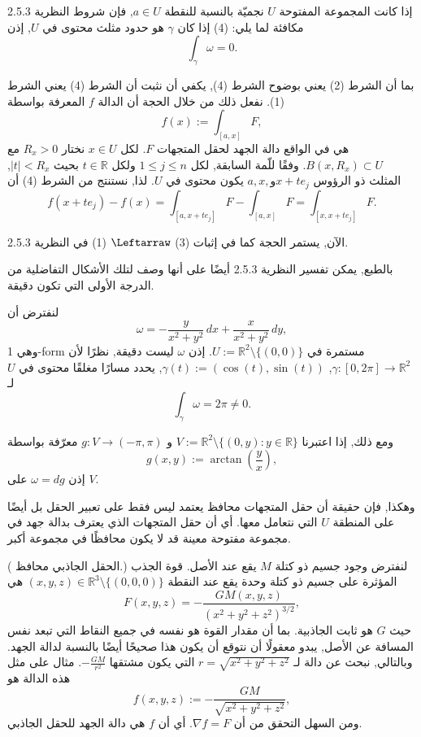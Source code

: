 \begin{theoreme}
إذا كانت المجموعة المفتوحة \( U \) نجميّة بالنسبة للنقطة \( a \in U \), فإن شروط النظرية 2.5.3 مكافئة لما يلي:
(4) إذا كان \( \gamma \) هو حدود مثلث محتوى في \( U \), إذن
\[ \int_\gamma \omega = 0. \]
\end{theoreme}

\begin{demonstration}
بما أن الشرط (2) يعني بوضوح الشرط (4), يكفي أن نثبت أن الشرط (4) يعني الشرط (1). نفعل ذلك من خلال الحجة أن الدالة \( f \) المعرفة بواسطة
\[ f(x) := \int_{[a, x]} F, \]
هي في الواقع دالة الجهد لحقل المتجهات \( F \). لكل \( x \in U \) نختار \( R_x > 0 \) مع \( B(x, R_x) \subset U \). وفقًا للّمة السابقة, لكل \( 1 \leq j \leq n \) ولكل \( t \in \mathbb{R} \) بحيث \(|t| < R_x \), المثلث ذو الرؤوس \( a, x, و x + t e_j \) يكون محتوى في \( U \). لذا, نستنتج من الشرط (4) أن
\[ f(x + t e_j) - f(x) = \int_{[a, x + t e_j]} F - \int_{[a, x]} F = \int_{[x, x + t e_j]} F. \]

الآن, يستمر الحجة كما في إثبات (3) $\Leftarraw$ (1) في النظرية 2.5.3. 
\end{demonstration}
بالطبع, يمكن تفسير النظرية 2.5.3 أيضًا على أنها وصف لتلك الأشكال التفاضلية من الدرجة الأولى التي تكون دقيقة.

\begin{exemple}
    لنفترض أن
\[ \omega = -\frac{y}{x^2 + y^2} \, dx + \frac{x}{x^2 + y^2} \, dy, \]
وهي 1-form مستمرة في \( U := \mathbb{R}^2 \setminus \{(0, 0)\} \). إذن \( \omega \) ليست دقيقة, نظرًا لأن \( \gamma : [0, 2\pi] \to \mathbb{R}^2 \), \( \gamma(t) := (\cos(t), \sin(t)) \), يحدد مسارًا مغلقًا محتوى في \( U \) لـ
\[ \int_\gamma \omega = 2\pi \neq 0. \]

ومع ذلك, إذا اعتبرنا \( V := \mathbb{R}^2 \setminus \{(0, y) : y \in \mathbb{R}\} \) و \( g : V \to (-\pi, \pi) \) معرّفة بواسطة
\[ g(x, y) := \arctan\left(\frac{y}{x}\right), \]
إذن \( \omega = dg \) على \( V \).
\end{exemple}

وهكذا, فإن حقيقة أن حقل المتجهات محافظ يعتمد ليس فقط على تعبير الحقل بل أيضًا على المنطقة \( U \) التي نتعامل معها. أي أن حقل المتجهات الذي يعترف بدالة جهد في مجموعة مفتوحة معينة قد لا يكون محافظًا في مجموعة أكبر.

\begin{exemple}
(
الحقل الجاذبي محافظ.) 
لنفترض وجود جسيم ذو كتلة \( M \) يقع عند الأصل. قوة الجذب المؤثرة على جسيم ذو كتلة وحدة يقع عند النقطة \( (x, y, z) \in \mathbb{R}^3 \setminus \{(0, 0, 0)\} \) هي
\[ F(x, y, z) = -\frac{GM(x, y, z)}{(x^2 + y^2 + z^2)^{3/2}}, \]
حيث \( G \) هو ثابت الجاذبية. بما أن مقدار القوة هو نفسه في جميع النقاط التي تبعد نفس المسافة عن الأصل, يبدو معقولًا أن نتوقع أن يكون هذا صحيحًا أيضًا بالنسبة لدالة الجهد. وبالتالي, نبحث عن دالة لـ \( r = \sqrt{x^2 + y^2 + z^2} \) التي يكون مشتقها \(-\frac{GM}{r^2}\). مثال على مثل هذه الدالة هو
\[ f(x, y, z) := -\frac{GM}{\sqrt{x^2 + y^2 + z^2}}, \]
ومن السهل التحقق من أن \( \nabla f = F \). أي أن \( f \) هي دالة الجهد للحقل الجاذبي.
\end{exemple}

